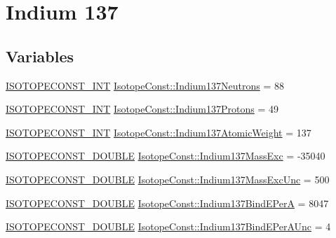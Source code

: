\hypertarget{group___isotope_const-_indium-_in137}{}\section{Indium 137}
\label{group___isotope_const-_indium-_in137}
\subsection*{Variables}
\begin{DoxyCompactItemize}
\item 
\mbox{\hyperlink{group___isotope_const-_macros_ga5f18360b3e99483a35c32d789e62621c}{I\+S\+O\+T\+O\+P\+E\+C\+O\+N\+S\+T\+\_\+\+I\+NT}} \mbox{\hyperlink{group___isotope_const-_indium-_in137_gad8be0693eb33687c20cedaec53837dae}{Isotope\+Const\+::\+Indium137\+Neutrons}} = 88
\item 
\mbox{\hyperlink{group___isotope_const-_macros_ga5f18360b3e99483a35c32d789e62621c}{I\+S\+O\+T\+O\+P\+E\+C\+O\+N\+S\+T\+\_\+\+I\+NT}} \mbox{\hyperlink{group___isotope_const-_indium-_in137_ga8e6e087fc1a8dc0d92fd7354ae98270a}{Isotope\+Const\+::\+Indium137\+Protons}} = 49
\item 
\mbox{\hyperlink{group___isotope_const-_macros_ga5f18360b3e99483a35c32d789e62621c}{I\+S\+O\+T\+O\+P\+E\+C\+O\+N\+S\+T\+\_\+\+I\+NT}} \mbox{\hyperlink{group___isotope_const-_indium-_in137_ga633ab68d3e5de90ca802e55ea32645ec}{Isotope\+Const\+::\+Indium137\+Atomic\+Weight}} = 137
\item 
\mbox{\hyperlink{group___isotope_const-_macros_ga8f45a7272ce02c0b4c65c44636ed719a}{I\+S\+O\+T\+O\+P\+E\+C\+O\+N\+S\+T\+\_\+\+D\+O\+U\+B\+LE}} \mbox{\hyperlink{group___isotope_const-_indium-_in137_ga9a80fb6f1a775c7f72bc2e94257501fd}{Isotope\+Const\+::\+Indium137\+Mass\+Exc}} = -\/35040
\item 
\mbox{\hyperlink{group___isotope_const-_macros_ga8f45a7272ce02c0b4c65c44636ed719a}{I\+S\+O\+T\+O\+P\+E\+C\+O\+N\+S\+T\+\_\+\+D\+O\+U\+B\+LE}} \mbox{\hyperlink{group___isotope_const-_indium-_in137_ga2f4726f5589fd786a25166d5f3ba9dba}{Isotope\+Const\+::\+Indium137\+Mass\+Exc\+Unc}} = 500
\item 
\mbox{\hyperlink{group___isotope_const-_macros_ga8f45a7272ce02c0b4c65c44636ed719a}{I\+S\+O\+T\+O\+P\+E\+C\+O\+N\+S\+T\+\_\+\+D\+O\+U\+B\+LE}} \mbox{\hyperlink{group___isotope_const-_indium-_in137_ga8d429096c17abe67a17ada72e722c94b}{Isotope\+Const\+::\+Indium137\+Bind\+E\+PerA}} = 8047
\item 
\mbox{\hyperlink{group___isotope_const-_macros_ga8f45a7272ce02c0b4c65c44636ed719a}{I\+S\+O\+T\+O\+P\+E\+C\+O\+N\+S\+T\+\_\+\+D\+O\+U\+B\+LE}} \mbox{\hyperlink{group___isotope_const-_indium-_in137_gabbf55cddbb6118d93ec0d48e20500db8}{Isotope\+Const\+::\+Indium137\+Bind\+E\+Per\+A\+Unc}} = 4

\end{DoxyCompactItemize}
